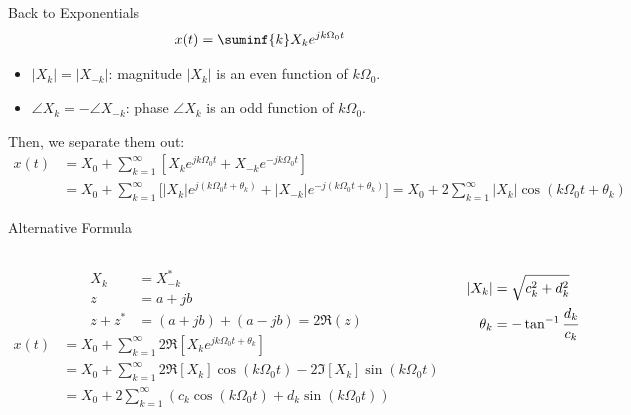 \documentclass[aspectratio=169,xcolor=dvipsnames,svgnames,x11names,fleqn]{beamer}
\begin{document}
\begin{frame}{Back to Exponentials}
    $$
    x(t) = \suminf{k} X_ke^{jk\Omega_0t}
    $$
    \begin{itemize}
    \item $|X_k| = |X_{-k}|$: magnitude  $|X_k|$ is an even function of $k\Omega_0$.
    \item $\angle X_k = - \angle X_{-k}$: phase  $\angle X_k$ is an odd function of $k\Omega_0$.
\end{itemize}
Then, we separate them out:
\begin{equation*}
    \begin{aligned}
x(t) & = X_0 + \sum_{k=1}^\infty [ X_k e^{jk\Omega_0t} + X_{-k}e^{-jk\Omega_0t} ]\\
& = X_0 + \sum_{k=1}^\infty \bigg[ |X_k| e^{j(k\Omega_0t + \theta_k)} + |X_{-k}|e^{-j(k\Omega_0t + \theta_k)}  \bigg] = X_0 + 2 \sum_{k=1}^\infty  |X_k| \cos (k\Omega_0 t  + \theta_k)
\end{aligned}
\end{equation*}

\end{frame}

\begin{frame}{Alternative Formula}
    \begin{columns}
        \begin{equation*}
    \begin{aligned}
        X_k & = X_{-k}^*\\
        z & = a + jb\\
        z + z^*  & = (a  + jb) + (a - j b) = 2\Re(z)
        \end{aligned}
\end{equation*}
        \begin{equation*}
    \begin{aligned}
x(t)  & = X_0 + \sum_{k=1}^\infty 2\Re[ X_k e^{jk\Omega_0t + \theta_k}]\\
& =  X_0  + \sum_{k=1}^\infty  2 \Re[X_k]\cos(k\Omega_0 t) - 2\Im[X_k]\sin(k\Omega_0 t)\\
&  = X_0 + 2\sum_{k=1}^\infty  ( c_k \cos(k\Omega_0 t)  + d_k \sin(k\Omega_0 t))
            \end{aligned}
\end{equation*}

          \begin{equation*}
    \begin{aligned}
|X_k| & = \sqrt{c_k^2  + d_k^2}\\
\theta_k & = -\tan^{-1}\cfrac{d_k}{c_k}
    \end{aligned}
\end{equation*}
    \end{columns}
\end{frame}
\end{document}
